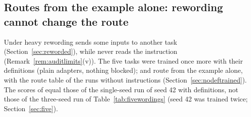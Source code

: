 \subsection{Routes from the example alone: rewording cannot change the route}
\label{sec:exampleroutes}

Under heavy rewording \cert{} sends some inputs to another task (Section~\ref{sec:reworded}), while \recog{} never
reads the instruction (Remark~\ref{rem:auditlimits}(v)). The five tasks were trained once more
with their definitions (plain adapters, nothing blocked); \recog{} and
\handicap{} route from the example alone, with the route table of the runs without
instructions (Section~\ref{sec:nodeftrained}). The scores of \cert{} equal those of the single-seed run of seed 42 with definitions, not those of the three-seed run of Table~\ref{tab:fivewordings} (seed 42 was trained twice; Section~\ref{sec:five}).

\begin{table}[t]
  \caption{The five tasks with their definitions, seed 42, plain adapters; the
  same adapters under each rule, at the four wordings. Top: final score (AP).
  Bottom: answers of the first four tasks that differ at the end, of \AudUCompared{}. ``Zone first'': the certified route where the input is
  inside a zone, otherwise the route of \recog{} or \handicap{}. The rows of the published
  methods are from Section~\ref{sec:reworded}.}
  \label{tab:instanceroutes}
  \centering
  
\end{table}

